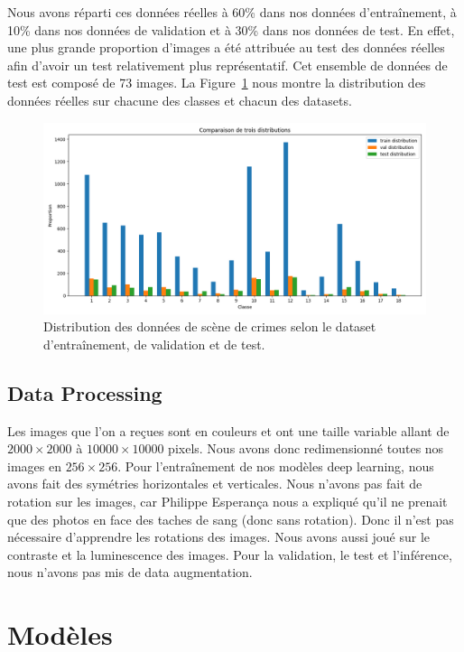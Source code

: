 \documentclass[a4paper]{article}
\begin{document}
Nous avons réparti ces données réelles à 60\% dans nos données d'entraînement, à 10\% dans nos données de validation et à 30\% dans nos données de test. En effet, une plus grande proportion d'images a été attribuée au test des données réelles afin d'avoir un test relativement plus représentatif. Cet ensemble de données de test est composé de 73 images. La Figure~\ref{fig:distribution real} nous montre la distribution des données réelles sur chacune des classes et chacun des datasets.

\begin{figure}[ht]
    \centering
    \includegraphics[width=0.8\linewidth]{../asset/distribution_train_val_test.png}
    \caption{Distribution des données de scène de crimes selon le dataset d'entraînement, de validation et de test.}
    \label{fig:distribution real}
\end{figure}

\subsection{Data Processing}
Les images que l'on a reçues sont en couleurs et ont une taille variable allant de $2000\times2000$ à $10000\times10000$ pixels. Nous avons donc redimensionné toutes nos images en $256\times256$. Pour l'entraînement de nos modèles deep learning, nous avons fait des symétries horizontales et verticales. Nous n'avons pas fait de rotation sur les images, car Philippe Esperança nous a expliqué qu'il ne prenait que des photos en face des taches de sang (donc sans rotation). Donc il n'est pas nécessaire d'apprendre les rotations des images. Nous avons aussi joué sur le contraste et la luminescence des images. Pour la validation, le test et l'inférence, nous n'avons pas mis de data augmentation.

\section{Modèles}
\end{document}
